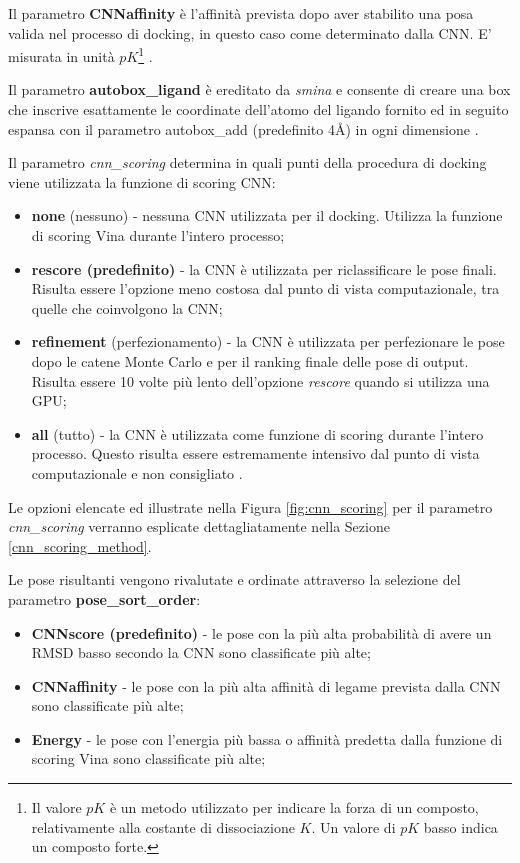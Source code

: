 Il parametro \textbf{CNNaffinity} è l'affinità prevista dopo aver stabilito una posa valida nel processo di docking, in questo caso come determinato dalla CNN. E' misurata in unità \(pK\)\footnote{Il valore \(pK\) è un metodo utilizzato per indicare la forza di un composto, relativamente alla costante di dissociazione \(K\).
Un valore di \(pK\) basso indica un composto forte.} \cite{mcnutt_gnina_2021}.

Il parametro \textbf{autobox\_ligand} è ereditato da \textit{smina} e consente di creare una box che inscrive esattamente le coordinate dell'atomo del ligando fornito ed in seguito espansa con il parametro autobox\_add (predefinito 4Å) in ogni dimensione \cite{mcnutt_gnina_2021}.

Il parametro \textit{cnn\_scoring} determina in quali punti della procedura di docking viene utilizzata la funzione di scoring CNN:
\begin{itemize}
    \item \textbf{none} (nessuno) - nessuna CNN utilizzata per il docking. Utilizza la funzione di scoring Vina durante l'intero processo;
    \item \textbf{rescore (predefinito)} - la CNN è utilizzata per riclassificare le pose finali. Risulta essere l'opzione meno costosa dal punto di vista computazionale, tra quelle che coinvolgono la CNN;
    \item \textbf{refinement} (perfezionamento) - la CNN è utilizzata per perfezionare le pose dopo le catene Monte Carlo e per il ranking finale delle pose di output. Risulta essere 10 volte più lento dell'opzione \textit{rescore} quando si utilizza una GPU;
    \item \textbf{all} (tutto) - la CNN è utilizzata come funzione di scoring durante l'intero processo. Questo risulta essere estremamente intensivo dal punto di vista computazionale e non consigliato \cite{mcnutt_gnina_2021}.
\end{itemize}
Le opzioni elencate ed illustrate nella Figura \ref{fig:cnn_scoring} per il parametro \textit{cnn\_scoring} verranno esplicate dettagliatamente nella Sezione \ref{cnn_scoring_method}.

Le pose risultanti vengono rivalutate e ordinate attraverso la selezione del parametro \textbf{pose\_sort\_order}:
\begin{itemize}
    \item \textbf{CNNscore (predefinito)} - le pose con la più alta probabilità di avere un RMSD basso secondo la CNN sono classificate più alte;
    \item \textbf{CNNaffinity} - le pose con la più alta affinità di legame prevista dalla CNN sono classificate più alte;
    \item \textbf{Energy} - le pose con l'energia più bassa o affinità predetta dalla funzione di scoring Vina sono classificate più alte;
\end{itemize}


